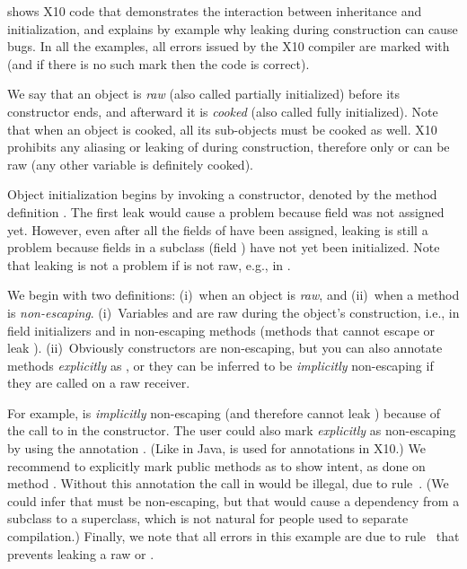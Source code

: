  shows X10 code that demonstrates the interaction
    between inheritance and initialization,
    and explains by example why leaking \this during construction can cause bugs.
In all the examples, all errors issued by the X10 compiler are marked with 
    (and if there is no such mark then the code is correct).

We say that an object is \emph{raw} (also called partially initialized) before its constructor ends,
    and afterward it is \emph{cooked} (also called fully initialized).
Note that when an object is cooked, all its sub-objects must be cooked as well.
X10 prohibits any aliasing or leaking of \this during construction,
    therefore only \this or  can be raw (any other variable is definitely cooked).

Object initialization begins by invoking a constructor,
    denoted by the method definition .
The first leak would cause a problem because field  was not assigned yet.
However, even after all the fields of  have been assigned,
    leaking is still a problem
    because fields in a subclass (field ) have not yet been initialized.
Note that leaking is not a problem if \this is not raw, e.g., in .

We begin with two definitions:
    (i)~when an object is \emph{raw}, and
    (ii)~when a method is \emph{non-escaping}.
(i)~Variables \this and  are raw
    during the object's construction,
    i.e., in field initializers and in {non-escaping} methods
    (methods that cannot escape or leak \this).
(ii)~Obviously constructors are non-escaping,
    but you can also annotate methods \emph{explicitly} as ,
    or they can be inferred to be \emph{implicitly} non-escaping
    if they are called on a raw \this receiver.

For example,  is \emph{implicitly} non-escaping (and therefore cannot leak \this)
    because of the call to 
    in the constructor.
The user could also mark  \emph{explicitly} as non-escaping by using the annotation
    .
(Like in Java,  is used for annotations in X10.)
We recommend to explicitly mark public methods as  to show intent,
    as done on method .
Without this annotation the call  in  would be illegal,
    due to rule~.
(We could infer that  must be non-escaping,
    but that would cause a dependency from a subclass to a superclass,
    which is not natural for people used to separate compilation.)
Finally, we note that all errors in this example are due to rule~
    that prevents leaking a raw \this or .




